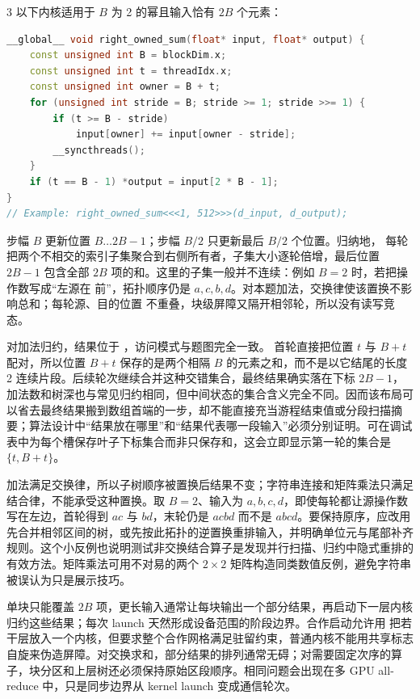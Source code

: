 \begin{solutionexercise}{3}
\answerheading 以下内核适用于 $B$ 为 2 的幂且输入恰有 $2B$ 个元素：
\begin{lstlisting}[language=C++]
__global__ void right_owned_sum(float* input, float* output) {
    const unsigned int B = blockDim.x;
    const unsigned int t = threadIdx.x;
    const unsigned int owner = B + t;
    for (unsigned int stride = B; stride >= 1; stride >>= 1) {
        if (t >= B - stride)
            input[owner] += input[owner - stride];
        __syncthreads();
    }
    if (t == B - 1) *output = input[2 * B - 1];
}
// Example: right_owned_sum<<<1, 512>>>(d_input, d_output);
\end{lstlisting}
步幅 $B$ 更新位置 $B\ldots2B-1$；步幅 $B/2$ 只更新最后 $B/2$ 个位置。归纳地，
每轮把两个不相交的索引子集聚合到右侧所有者，子集大小逐轮倍增，最后位置 $2B-1$
包含全部 $2B$ 项的和。这里的子集一般并不连续：例如 $B=2$ 时，若把操作数写成“左源在
前”，拓扑顺序仍是 $a,c,b,d$。对本题加法，交换律使该置换不影响总和；每轮源、目的位置
不重叠，块级屏障又隔开相邻轮，所以没有读写竞态。

\conclusionheading 对加法归约，结果位于 ，访问模式与题图完全一致。
\discussionheading
{}首轮直接把位置 $t$ 与 $B+t$ 配对，所以位置 $B+t$ 保存的是两个相隔 $B$ 的元素之和，而不是以它结尾的长度 2 连续片段。后续轮次继续合并这种交错集合，最终结果确实落在下标 $2B-1$，加法数和树深也与常见归约相同，但中间状态的集合含义完全不同。因而该布局可以省去最终结果搬到数组首端的一步，却不能直接充当游程结束值或分段扫描摘要；算法设计中“结果放在哪里”和“结果代表哪一段输入”必须分别证明。可在调试表中为每个槽保存叶子下标集合而非只保存和，这会立即显示第一轮的集合是 $\{t,B+t\}$。

加法满足交换律，所以子树顺序被置换后结果不变；字符串连接和矩阵乘法只满足结合律，不能承受这种置换。取 $B=2$、输入为 $a,b,c,d$，即使每轮都让源操作数写在左边，首轮得到 $ac$ 与 $bd$，末轮仍是 $acbd$ 而不是 $abcd$。要保持原序，应改用先合并相邻区间的树，或先按此拓扑的逆置换重排输入，并明确单位元与尾部补齐规则。这个小反例也说明测试非交换结合算子是发现并行扫描、归约中隐式重排的有效方法。矩阵乘法可用不对易的两个 $2\times2$ 矩阵构造同类数值反例，避免字符串被误认为只是展示技巧。

单块只能覆盖 $2B$ 项，更长输入通常让每块输出一个部分结果，再启动下一层内核归约这些结果；每次 launch 天然形成设备范围的阶段边界。合作启动允许用  把若干层放入一个内核，但要求整个合作网格满足驻留约束，普通内核不能用共享标志自旋来伪造屏障。对交换求和，部分结果的排列通常无碍；对需要固定次序的算子，块分区和上层树还必须保持原始区段顺序。相同问题会出现在多 GPU all-reduce 中，只是同步边界从 kernel launch 变成通信轮次。


\end{solutionexercise}
